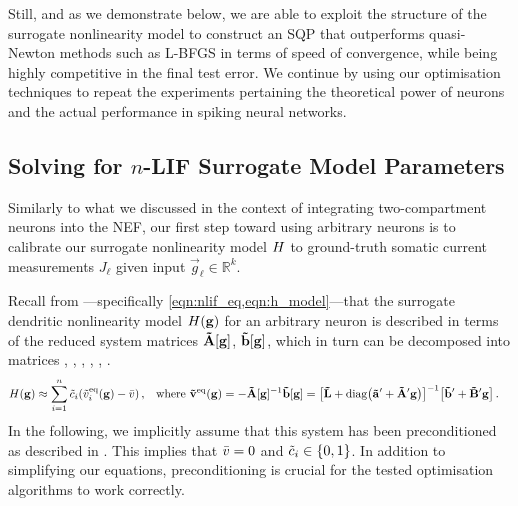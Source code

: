 Still, and as we demonstrate below, we are able to exploit the structure of the surrogate nonlinearity model \Hden to construct an SQP that outperforms quasi-Newton methods such as L-BFGS in terms of speed of convergence, while being highly competitive in the final test error.
We continue by using our optimisation techniques to repeat the experiments pertaining the theoretical power of \nlif neurons and the actual performance in spiking neural networks.

\subsection{Solving for $n$-LIF Surrogate Model Parameters}
\label{sec:nlif_opt_parameters}

Similarly to what we discussed in the context of integrating two-compartment neurons into the NEF, our first step toward using arbitrary \nlif neurons is to calibrate our surrogate nonlinearity model ${H}$ to ground-truth somatic current measurements $J_\ell$ given input $\vec g_\ell \in \mathbb{R}^k$.

Recall from ---specifically \cref{eqn:nlif_eq,eqn:h_model}---that the surrogate dendritic nonlinearity model ${H}(\mathbf{g})$ for an arbitrary \nlif neuron is described in terms of the reduced system matrices $\mathbf{\tilde A}[\mathbf{g}]$, $\mathbf{\tilde b}[\mathbf{g}]$, which in turn can be decomposed into matrices \mrL, \vrap, \mrAp, \vrbp, \mrBp, \vrc.
\begin{align*}
	{\ensuremath{H}}(\mathbf{g})
		&\approx \sum_{i = 1}^n {\tilde c}_i ({\tilde v}_i^\mathrm{eq}(\mathbf{g}) - {{\bar v}}) \,,
		& \text{where } \mathbf{\tilde v}^\mathrm{eq}(\mathbf{g})
			&= -{\mathbf{\tilde A}}[\mathbf{g}]^{-1} \mathbf{\tilde b}[\mathbf{g}]
			 = \bigl[\mathbf{\tilde L} + \operatorname{\mathrm{diag}}\bigl(\mathbf{\tilde a}' + \mathbf{\tilde A}' \mathbf{g}\bigr) \bigr]^{-1} \bigl[ \mathbf{\tilde b}' + \mathbf{\tilde B}' \mathbf{g} \bigr] \,.
\end{align*}
In the following, we implicitly assume that this system has been preconditioned as described in .
This implies that ${{\bar v}} = 0$ and ${\tilde c}_i \in \{0, 1\}$.
In addition to simplifying our equations, preconditioning is crucial for the tested optimisation algorithms to work correctly.

